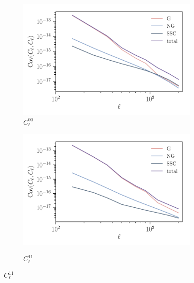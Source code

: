 \documentclass[a4paper,11pt]{article}
\begin{document}
    \begin{figure}
      \begin{center}
        \begin{subfigure}{0.49\textwidth}
        \includegraphics[width=\textwidth]{figures/covmat_HSC_dg_hoddg_hodxdg_hoddg_hod_trisp=4h3h2h_SSC=LINBIAS-resp_l=ells_eff_all_wcross_clfit=HOD-zevol_culled=True_coadd=area_comparison=G+NG+SSC_bin=0.pdf}
        \caption{$C_{\ell}^{00}$}
        \end{subfigure}
        \begin{subfigure}{0.49\textwidth}
        \includegraphics[width=\textwidth]{figures/covmat_HSC_dg_hoddg_hodxdg_hoddg_hod_trisp=4h3h2h_SSC=LINBIAS-resp_l=ells_eff_all_wcross_clfit=HOD-zevol_culled=True_coadd=area_comparison=G+NG+SSC_bin=1.pdf} \\
        \caption{$C_{\ell}^{11}$}
        \end{subfigure}

\end{center}
\end{figure}
\end{document}
